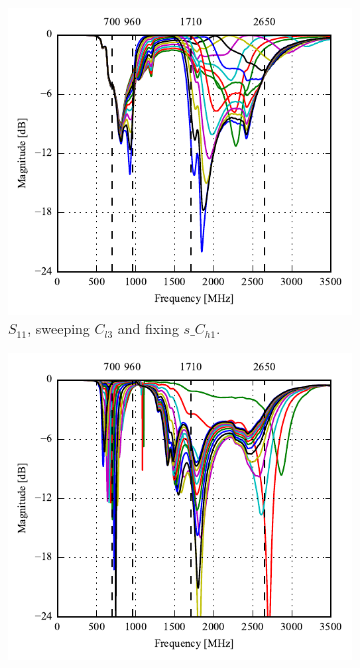 \begin{figure}[htbp]
   \begin{subfigure}[b]{0.49\linewidth}
        \centering
        \includegraphics{img/tech_sol/nonresonant/simulation/data_mode/s11_top_sweep.pdf}
        \caption{$S_{11}$, sweeping $C_{l3}$ and fixing $s\_C_{h1}$.}
    \end{subfigure}
    \hfill
    \begin{subfigure}[b]{0.49\linewidth}
        \centering
        \includegraphics{img/tech_sol/nonresonant/simulation/data_mode/s22_side_sweep.pdf}

\end{subfigure}
\end{figure}
